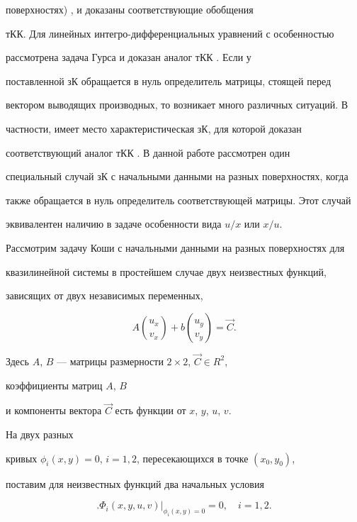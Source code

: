 поверхностях) \cite{3}, \cite{4} и доказаны соответствующие обобщения


тКК. Для линейных интегро-дифференциальных уравнений с особенностью


рассмотрена задача Гурса и доказан аналог тКК \cite{5}. Если у


поставленной зК обращается в нуль определитель матрицы, стоящей перед


вектором выводящих производных, то возникает много различных ситуаций. В


частности, имеет место характеристическая зК, для которой доказан


соответствующий аналог тКК \cite{6}. В данной работе рассмотрен один


специальный случай зК с начальными данными на разных поверхностях, когда


также обращается в нуль определитель соответствующей матрицы. Этот случай


эквивалентен наличию в задаче особенности вида $u/x$ или $x/u$.





Рассмотрим задачу Коши с начальными данными на разных поверхностях для


квазилинейной системы в простейшем случае двух неизвестных функций,


зависящих от двух независимых переменных,


\begin{equation}


A\binom{u_x}{v_x}+b\binom{u_y}{v_y}=\Vec C.


\end{equation}


Здесь $A$, $B$ --- матрицы размерности $2\times 2$, $\Vec C\in R^2$,


коэффициенты матриц $A$, $B$


и компоненты вектора $\Vec C$ есть функции от $x$, $y$, $u$, $v$.


На двух разных


кривых $\phi_i(x,y)=0$, $i=1,2$, пересекающихся в точке $(x_0,y_0)$,


поставим для неизвестных функций два начальных условия


\begin{equation}


\bigl.\Phi_i(x,y,u,v)\bigr|_{\phi_i(x,y)=0}=0,\quad i=1,2.


\end{equation}


